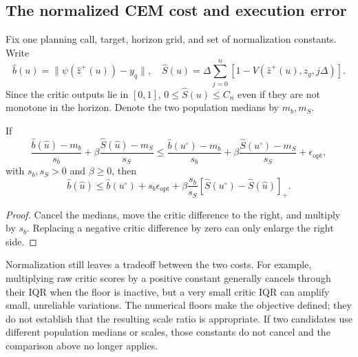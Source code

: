 \documentclass{article} %
\theoremstyle{definition}
\theoremstyle{remark}
\begin{document}
\subsection{The normalized CEM cost and execution error}
\label{app:cost-proof}
Fix one planning call, target, horizon grid, and set of normalization constants.
Write
\[
 \widehat b(u)=\|\psi(\hat z^+(u))-y_q\|,\quad
 \widehat S(u)=\Delta\sum_{j=0}^{n}[1-V(\hat z^+(u),z_g,j\Delta)].
\]
Since the critic outputs lie in $[0,1]$, $0\le\widehat S(u)\le C_n$ even if they are
not monotone in the horizon. Denote the two population medians by $m_b,m_S$.

\begin{lemma}
\label{lem:normalized}
If
\[
 \frac{\widehat b(\hat u)-m_b}{s_b}
 +\beta\frac{\widehat S(\hat u)-m_S}{s_S}
 \le
 \frac{\widehat b(u^\circ)-m_b}{s_b}
 +\beta\frac{\widehat S(u^\circ)-m_S}{s_S}
 +\epsilon_{\mathrm{opt}},
\]
with $s_b,s_S>0$ and $\beta\ge0$, then
\begin{equation}
 \widehat b(\hat u)\le\widehat b(u^\circ)
       +s_b\epsilon_{\mathrm{opt}}
       +\beta\frac{s_b}{s_S}
                    [\widehat S(u^\circ)-\widehat S(\hat u)]_+ .
 \label{eq:scale-comparison}
\end{equation}
\end{lemma}
\begin{proof}
Cancel the medians, move the critic difference to the right, and multiply by $s_b$.
Replacing a negative critic difference by zero can only enlarge the right side.
\end{proof}
Normalization still leaves a tradeoff between the two costs.
For example, multiplying raw critic scores by a positive constant generally cancels
through their IQR when the floor is inactive, but a very small critic IQR can amplify
small, unreliable variations. The numerical floors make the objective defined; they
do not establish that the resulting scale ratio is appropriate.
If two candidates use different population medians or scales, those constants do not
cancel and the comparison above no longer applies.
\end{document}
